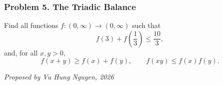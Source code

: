 \subsubsection*{Problem 5. The Triadic Balance}

\begin{exercisebox}[medium]

Find all functions $f:(0,\infty)\to(0,\infty)$ such that
\[
f(3)+f\left(\frac13\right)\le \frac{10}{3},
\]
and, for all $x,y>0$,
\[
f(x+y)\ge f(x)+f(y),
\qquad
f(xy)\le f(x)f(y).
\]

\begin{flushright}
\textit{Proposed by Vu Hung Nguyen, 2026}
\end{flushright}


\end{exercisebox}